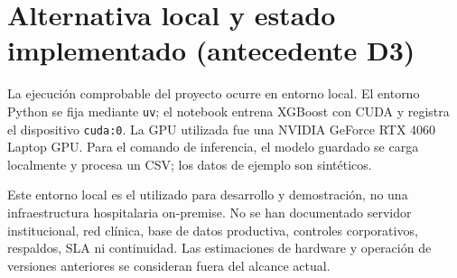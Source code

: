 \section{Alternativa local y estado implementado (antecedente D3)}

La ejecución comprobable del proyecto ocurre en entorno local. El entorno Python se fija mediante \texttt{uv}; el notebook entrena XGBoost con CUDA y registra el dispositivo \texttt{cuda:0}. La GPU utilizada fue una NVIDIA GeForce RTX 4060 Laptop GPU. Para el comando de inferencia, el modelo guardado se carga localmente y procesa un CSV; los datos de ejemplo son sintéticos.

Este entorno local es el utilizado para desarrollo y demostración, no una infraestructura hospitalaria on-premise. No se han documentado servidor institucional, red clínica, base de datos productiva, controles corporativos, respaldos, SLA ni continuidad. Las estimaciones de hardware y operación de versiones anteriores se consideran fuera del alcance actual.

